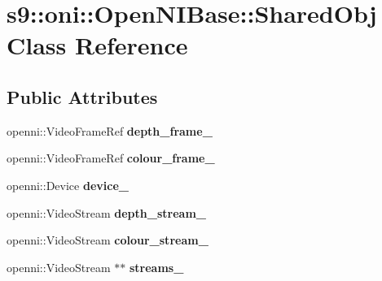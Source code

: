 \hypertarget{classs9_1_1oni_1_1OpenNIBase_1_1SharedObj}{\section{s9\-:\-:oni\-:\-:Open\-N\-I\-Base\-:\-:Shared\-Obj Class Reference}
\label{classs9_1_1oni_1_1OpenNIBase_1_1SharedObj}
}
\subsection*{Public Attributes}
\begin{DoxyCompactItemize}
\item 
\hypertarget{classs9_1_1oni_1_1OpenNIBase_1_1SharedObj_a35f97cf50ef26ea4ccda292f1e84f2c0}{openni\-::\-Video\-Frame\-Ref {\bfseries depth\-\_\-frame\-\_\-}}\label{classs9_1_1oni_1_1OpenNIBase_1_1SharedObj_a35f97cf50ef26ea4ccda292f1e84f2c0}

\item 
\hypertarget{classs9_1_1oni_1_1OpenNIBase_1_1SharedObj_af6e772ebe4ce408237a02cd5516fc1f4}{openni\-::\-Video\-Frame\-Ref {\bfseries colour\-\_\-frame\-\_\-}}\label{classs9_1_1oni_1_1OpenNIBase_1_1SharedObj_af6e772ebe4ce408237a02cd5516fc1f4}

\item 
\hypertarget{classs9_1_1oni_1_1OpenNIBase_1_1SharedObj_a8bc747e1925bbb62c43193f2be29fc29}{openni\-::\-Device {\bfseries device\-\_\-}}\label{classs9_1_1oni_1_1OpenNIBase_1_1SharedObj_a8bc747e1925bbb62c43193f2be29fc29}

\item 
\hypertarget{classs9_1_1oni_1_1OpenNIBase_1_1SharedObj_a67456be9d9b6b5b8785e2cf0ffd8c099}{openni\-::\-Video\-Stream {\bfseries depth\-\_\-stream\-\_\-}}\label{classs9_1_1oni_1_1OpenNIBase_1_1SharedObj_a67456be9d9b6b5b8785e2cf0ffd8c099}

\item 
\hypertarget{classs9_1_1oni_1_1OpenNIBase_1_1SharedObj_ada9072f589f7d008f51b963761a6fd60}{openni\-::\-Video\-Stream {\bfseries colour\-\_\-stream\-\_\-}}\label{classs9_1_1oni_1_1OpenNIBase_1_1SharedObj_ada9072f589f7d008f51b963761a6fd60}

\item 
\hypertarget{classs9_1_1oni_1_1OpenNIBase_1_1SharedObj_ab8a1ed207241b69992cd590eaaf3fe98}{openni\-::\-Video\-Stream $\ast$$\ast$ {\bfseries streams\-\_\-}}\label{classs9_1_1oni_1_1OpenNIBase_1_1SharedObj_ab8a1ed207241b69992cd590eaaf3fe98}


\end{DoxyCompactItemize}
